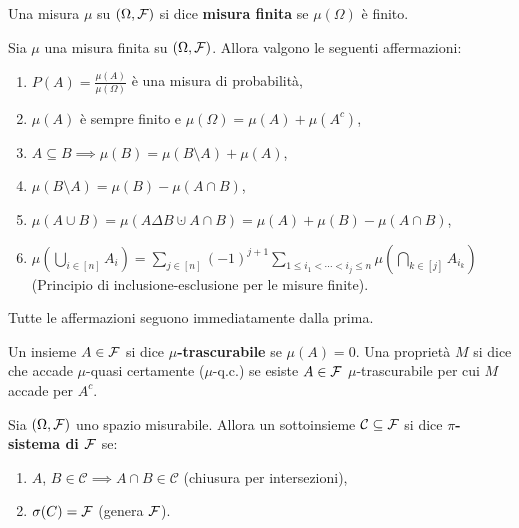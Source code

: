 \begin{multicols*}{2}
\begin{definition}
    Una misura $\mu$ su $(\Omega, \mathcal{F})$ si dice \textbf{misura finita} se $\mu(\Omega)$ è finito.
\end{definition}

\begin{proposition}
    Sia $\mu$ una misura finita su $(\Omega, \mathcal{F})$. Allora valgono le seguenti affermazioni:
    \begin{enumerate}[(i.)]
        \item $P(A) = \frac{\mu(A)}{\mu(\Omega)}$ è una misura di probabilità,
        \item $\mu(A)$ è sempre finito e $\mu(\Omega) = \mu(A) + \mu(A^c)$,
        \item $A \subseteq B \implies \mu(B) = \mu(B \setminus A) + \mu(A)$,
        \item $\mu(B \setminus A) = \mu(B) - \mu(A \cap B)$,
        \item $\mu(A \cup B) = \mu(A \Delta B \cupdot A \cap B) = \mu(A) + \mu(B) - \mu(A \cap B)$,
        \item $\mu\left(\bigcup_{i \in [n]} A_i\right) = \sum_{j \in [n]} (-1)^{j+1} \sum_{1 \leq i_1 < \cdots < i_j \leq n} \mu\left(\bigcap_{k \in [j]} A_{i_{k}}\right)$ (Principio di inclusione-esclusione per le misure finite).
    \end{enumerate}

    Tutte le affermazioni seguono immediatamente dalla prima.
\end{proposition}

\begin{definition}
    Un insieme $A \in \mathcal{F}$ si dice \textbf{$\mu$-trascurabile} se
    $\mu(A) = 0$. Una proprietà $M$ si dice che accade
    $\mu$-quasi certamente ($\mu$-q.c.) se esiste $A \in \mathcal{F}$ $\mu$-trascurabile per cui
    $M$ accade per $A^c$.
\end{definition}

\begin{definition}
    Sia $(\Omega, \mathcal{F})$ uno spazio misurabile. Allora un sottoinsieme $\mathcal{C} \subseteq \mathcal{F}$
    si dice \textbf{$\pi$-sistema di $\mathcal{F}$} se:
    \begin{enumerate}[(i.)]
        \item $A$, $B \in \mathcal{C} \implies A \cap B \in \mathcal{C}$ (chiusura per intersezioni),
        \item $\sigma(C) = \mathcal{F}$ (genera $\mathcal{F}$).
    \end{enumerate}
\end{definition}


\end{multicols*}
